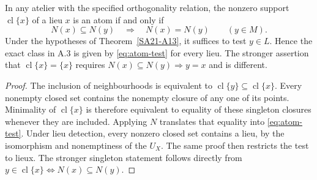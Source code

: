 \begin{theorem}
\label{SA21-A14}
In any atelier with the specified orthogonality relation, the nonzero
support $\operatorname{cl}\{x\}$ of a lieu $x$ is an atom if and only if
\begin{equation}\label{eq:atom-test}
 N(x)\subseteq N(y)\quad\Longrightarrow\quad N(x)=N(y)
 \qquad (y\in M).
\end{equation}
Under the hypotheses of Theorem~\ref{SA21-A13}, it suffices to test
$y\in L$. Hence the exact class in A.3 is given by
\eqref{eq:atom-test} for every lieu. The stronger assertion that
$\operatorname{cl}\{x\}=\{x\}$ requires
$N(x)\subseteq N(y)\Rightarrow y=x$ and is different.
\end{theorem}
\begin{proof}
The inclusion of neighbourhoods is equivalent to
$\operatorname{cl}\{y\}\subseteq\operatorname{cl}\{x\}$.
Every nonempty closed set contains the nonempty closure of any one of
its points. Minimality of $\operatorname{cl}\{x\}$ is therefore
equivalent to equality of these singleton closures whenever they
are included. Applying $N$ translates that equality into
\eqref{eq:atom-test}. Under lieu detection, every nonzero closed set
contains a lieu, by the isomorphism and nonemptiness of the $U_X$.
The same proof then restricts the test to lieux. The stronger
singleton statement follows directly from
$y\in\operatorname{cl}\{x\}\iff N(x)\subseteq N(y)$.
\end{proof}



